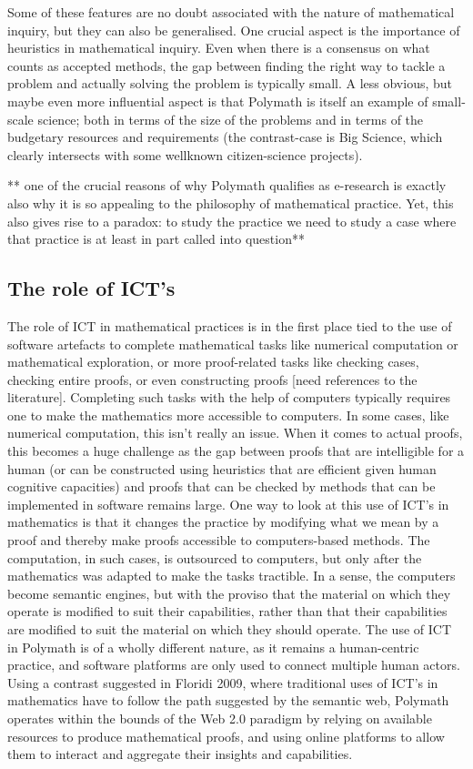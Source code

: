 \documentclass[article, floatfix, groupaddress, prb]{revtex4-1}
\begin{document}
Some of these features are no doubt associated with the nature of
mathematical inquiry, but they can also be generalised. One crucial
aspect is the importance of heuristics in mathematical inquiry. Even
when there is a consensus on what counts as accepted methods, the gap
between finding the right way to tackle a problem and actually solving
the problem is typically small. A less obvious, but maybe even more
influential aspect is that Polymath is itself an example of small-scale
science; both in terms of the size of the problems and in terms of the
budgetary resources and requirements (the contrast-case is Big Science,
which clearly intersects with some wellknown citizen-science projects).

** one of the crucial reasons of why Polymath qualifies as e-research is
exactly also why it is so appealing to the philosophy of mathematical
practice. Yet, this also gives rise to a paradox: to study the practice
we need to study a case where that practice is at least in part called
into question**

    \subsection{The role of ICT's}\label{the-role-of-icts}

The role of ICT in mathematical practices is in the first place tied to
the use of software artefacts to complete mathematical tasks like
numerical computation or mathematical exploration, or more proof-related
tasks like checking cases, checking entire proofs, or even constructing
proofs {[}need references to the literature{]}. Completing such tasks
with the help of computers typically requires one to make the
mathematics more accessible to computers. In some cases, like numerical
computation, this isn't really an issue. When it comes to actual proofs,
this becomes a huge challenge as the gap between proofs that are
intelligible for a human (or can be constructed using heuristics that
are efficient given human cognitive capacities) and proofs that can be
checked by methods that can be implemented in software remains large.
One way to look at this use of ICT's in mathematics is that it changes
the practice by modifying what we mean by a proof and thereby make
proofs accessible to computers-based methods. The computation, in such
cases, is outsourced to computers, but only after the mathematics was
adapted to make the tasks tractible. In a sense, the computers become
semantic engines, but with the proviso that the material on which they
operate is modified to suit their capabilities, rather than that their
capabilities are modified to suit the material on which they should
operate. The use of ICT in Polymath is of a wholly different nature, as
it remains a human-centric practice, and software platforms are only
used to connect multiple human actors. Using a contrast suggested in
Floridi 2009, where traditional uses of ICT's in mathematics have to
follow the path suggested by the semantic web, Polymath operates within
the bounds of the Web 2.0 paradigm by relying on available resources to
produce mathematical proofs, and using online platforms to allow them to
interact and aggregate their insights and capabilities.
\end{document}
